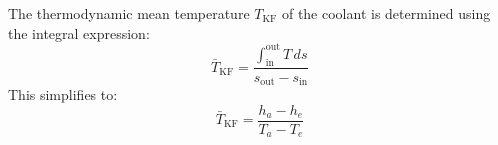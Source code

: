 The thermodynamic mean temperature \( T_{\text{KF}} \) of the coolant is determined using the integral expression:  
\[
\bar{T}_{\text{KF}} = \frac{\int_{\text{in}}^{\text{out}} T \, ds}{s_{\text{out}} - s_{\text{in}}}
\]  
This simplifies to:  
\[
\bar{T}_{\text{KF}} = \frac{h_a - h_e}{T_a - T_e}
\]